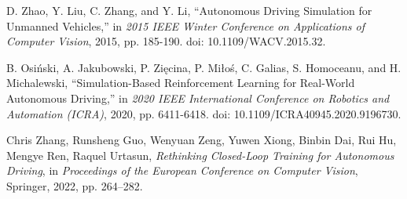 \documentclass[lettersize,journal]{IEEEtran}
\begin{document}
\begin{thebibliography}{1}
D. Zhao, Y. Liu, C. Zhang, and Y. Li, ``Autonomous Driving Simulation for Unmanned Vehicles,'' in \textit{2015 IEEE Winter Conference on Applications of Computer Vision}, 2015, pp. 185-190. doi: 10.1109/WACV.2015.32.

B. Osiński, A. Jakubowski, P. Zięcina, P. Miłoś, C. Galias, S. Homoceanu, and H. Michalewski, ``Simulation-Based Reinforcement Learning for Real-World Autonomous Driving,'' in \textit{2020 IEEE International Conference on Robotics and Automation (ICRA)}, 2020, pp. 6411-6418. doi: 10.1109/ICRA40945.2020.9196730.

Chris Zhang, Runsheng Guo, Wenyuan Zeng, Yuwen Xiong, Binbin Dai, Rui Hu, Mengye Ren, Raquel Urtasun,
\textit{Rethinking Closed-Loop Training for Autonomous Driving}, in \textit{Proceedings of the European Conference on Computer Vision}, Springer, 2022, pp. 264--282.


\end{thebibliography}
\end{document}
